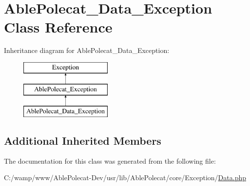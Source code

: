 \hypertarget{class_able_polecat___data___exception}{}\section{Able\+Polecat\+\_\+\+Data\+\_\+\+Exception Class Reference}
\label{class_able_polecat___data___exception}
Inheritance diagram for Able\+Polecat\+\_\+\+Data\+\_\+\+Exception\+:\begin{figure}[H]
\begin{center}
\leavevmode
\includegraphics[height=3.000000cm]{class_able_polecat___data___exception}
\end{center}
\end{figure}
\subsection*{Additional Inherited Members}


The documentation for this class was generated from the following file\+:\begin{DoxyCompactItemize}
\item 
C\+:/wamp/www/\+Able\+Polecat-\/\+Dev/usr/lib/\+Able\+Polecat/core/\+Exception/\hyperlink{_exception_2_data_8php}{Data.\+php}\end{DoxyCompactItemize}

